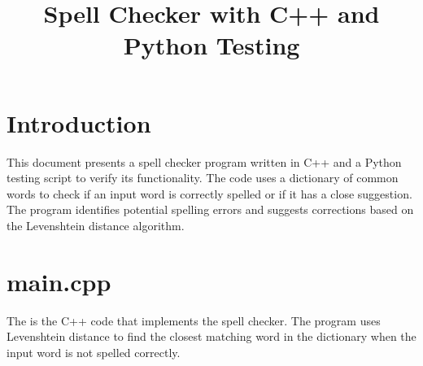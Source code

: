 \documentclass{article}
\title{Spell Checker with C++ and Python Testing}
\author{}
\date{}
\begin{document}
\maketitle

\section*{Introduction}
This document presents a spell checker program written in C++ and a Python testing script to verify its functionality. The code uses a dictionary of common words to check if an input word is correctly spelled or if it has a close suggestion. The program identifies potential spelling errors and suggests corrections based on the Levenshtein distance algorithm.

\section*{main.cpp}
The is the C++ code that implements the spell checker. The program uses Levenshtein distance to find the closest matching word in the dictionary when the input word is not spelled correctly.
\end{document}
